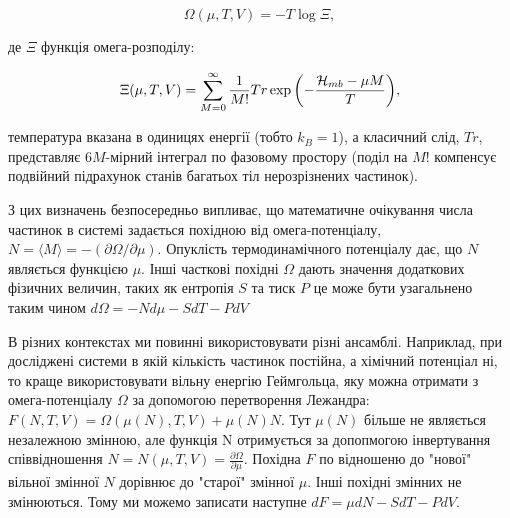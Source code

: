 \begin{equation}
\label{eqn:omegapotential}
	\Omega(\mu,T,V) = -T\log\Xi,
\end{equation}
 
де $\Xi$ функція омега-розподілу:

\begin{equation}
\label{eqn:sgranddistr}
	\Xi(\mu, T, V) = \sum\limits_{M = 0}^\infty\frac{1}{M!}Tr\exp{\left(-\frac{{\cal H}_{mb} - {\mu} M}{T}\right)},
\end{equation}

температура вказана в одиницях енергії (тобто $k_{B} = 1$), а класичний слід, $Tr$, представляє $6M$-мірний інтеграл по фазовому простору (поділ на $M!$ компенсує подвійний підрахунок станів багатьох тіл нерозрізнених частинок). 

З цих визначень безпосередньо випливає, що математичне очікування числа частинок в системі задається похідною від омега-потенціалу, $N = \langle M \rangle = -(\partial{\Omega}/\partial{\mu})$. Опуклість термодинамічного потенціалу \cite{convexfreeenerg} дає, що $N$ являється функцією $\mu$. Інші часткові похідні $\Omega$ дають значення додаткових фізичних величин, таких як ентропія $S$ та тиск $P$ це може бути узагальнено таким чином $d\Omega = -Nd\mu - SdT - PdV$

В різних контекстах ми повинні використовувати різні ансамблі. Наприклад, при досліджені системи в якій кількість частинок постійна, а хімічний потенціал ні, то краще використовувати вільну енергію Геймгольца, яку можна отримати з омега-потенціалу $\Omega$ за допомогою перетворення Лежандра: $F(N,T,V) = \Omega(\mu(N),T,V)+\mu(N)N.$
Тут $\mu(N)$ більше не являється незалежною змінною, але функція N отримується за допопмогою інвертування співвідношення $N = N({\mu},T,V)=\frac{\partial\Omega}{\partial\mu}.$ Похідна $F$ по відношеню до "нової" вільної змінної $N$ дорівнює до "старої" змінної $\mu$. Інші похідні змінних не змінюються. Тому ми можемо записати наступне $dF={\mu}dN - SdT - PdV$.

